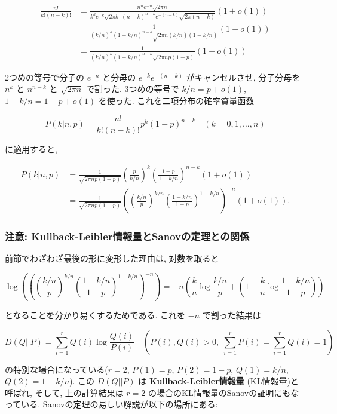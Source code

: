 \documentclass[10pt, a4paper,xelatex,ja=standard]{bxjsarticle}
\begin{document}
\[
\begin{aligned}
\frac{n!}{k!(n-k)!} &=
\frac{n^n e^{-n} \sqrt{2\pi n}}{k^k e^{-k} \sqrt{2\pi k}\;(n-k)^{n-k} e^{-(n-k)} \sqrt{2\pi (n-k)}}
(1 + o(1))
\\ &=
\frac{1}{(k/n)^k(1-k/n)^{n-k}\sqrt{2\pi n(k/n)(1-k/n)}}(1 + o(1))
\\ &=
\frac{1}{(k/n)^k(1-k/n)^{n-k}\sqrt{2\pi np(1-p)}}(1 + o(1))
\end{aligned}
\]

2つめの等号で分子の \(e^{-n}\) と分母の \(e^{-k}e^{-(n-k)}\)
がキャンセルさせ, 分子分母を \(n^k\) と \(n^{n-k}\) と \(\sqrt{2\pi n}\)
で割った. 3つめの等号で \(k/n = p + o(1)\), \(1-k/n = 1-p + o(1)\)
を使った. これを二項分布の確率質量函数

\[
P(k|n,p) = \frac{n!}{k!(n-k)!} p^k(1-p)^{n-k} \quad (k=0,1,\ldots,n)
\]

に適用すると,

\[
\begin{aligned}
P(k|n,p) &=
\frac{1}{\sqrt{2\pi np(1-p)}}
\left(\frac{p}{k/n}\right)^k\left(\frac{1-p}{1-k/n}\right)^{n-k}
(1 + o(1))
\\ &=
\frac{1}{\sqrt{2\pi np(1-p)}}
\left(\left(\frac{k/n}{p}\right)^{k/n}\left(\frac{1-k/n}{1-p}\right)^{1-k/n}\right)^{-n}
(1 + o(1)).
\end{aligned}
\]

    \hypertarget{ux6ce8ux610f-kullback-leiblerux60c5ux5831ux91cfux3068sanovux306eux5b9aux7406ux3068ux306eux95a2ux4fc2}{%
\subsubsection{注意:
Kullback-Leibler情報量とSanovの定理との関係}\label{ux6ce8ux610f-kullback-leiblerux60c5ux5831ux91cfux3068sanovux306eux5b9aux7406ux3068ux306eux95a2ux4fc2}}

前節でわざわざ最後の形に変形した理由は, 対数を取ると

\[
\log\left(
\left(\left(\frac{k/n}{p}\right)^{k/n}\left(\frac{1-k/n}{1-p}\right)^{1-k/n}\right)^{-n}
\right) = -n\left(\frac{k}{n}\log\frac{k/n}{p} + \left(1-\frac{k}{n}\log\frac{1-k/n}{1-p}\right)\right)
\]

となることを分かり易くするためである. これを \(-n\) で割った結果は

\[
D(Q||P) = \sum_{i=1}^r Q(i) \log\frac{Q(i)}{P(i)}\quad
\left(P(i), Q(i) > 0,\; \sum_{i=1}^r P(i) = \sum_{i=1}^r Q(i) = 1\right)
\]

の特別な場合になっている(\(r=2\), \(P(1)=p\), \(P(2)=1-p\),
\(Q(1)=k/n\), \(Q(2)=1-k/n\)). この \(D(Q||P)\) は
\textbf{Kullback-Leibler情報量} (KL情報量)と呼ばれ, そして,
上の計算結果は \(r=2\) の場合のKL情報量のSanovの証明にもなっている.
Sanovの定理の易しい解説が以下の場所にある:
\end{document}
